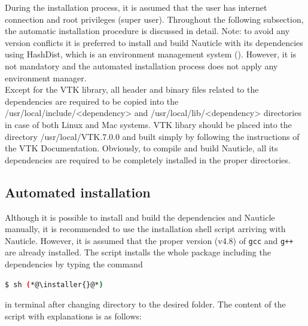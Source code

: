 \documentclass[a4paper,12pt,openany]{book}
\newcommand{\myhref}[3][nauticlegreen_dark]{\href{#2}{\color{#1}{#3}}}%
\theoremstyle{break}
\begin{document}
During the installation process, it is assumed that the user has internet connection and root privileges (super user). Throughout the following subsection, the automatic installation procedure is discussed in detail.
Note: to avoid any version conflicts it is preferred to install and build Nauticle with its dependencies using HashDist, which is an environment management system (\myhref{https://github.com/hashdist/hashdist}{https://github.com/hashdist/ hashdist}). However, it is not mandatory and the automated installation process does not apply any environment manager. \\
Except for the VTK library, all header and binary files related to the dependencies are required to be copied into the /usr/local/include/<dependency> and /usr/local/lib/<dependency> directories in case of both Linux and Mac systems. VTK libary should be placed into the directory /usr/local/VTK.7.0.0 and built simply by following the instructions of the VTK Documentation. Obviously, to compile and build Nauticle, all its dependencies are required to be completely installed in the proper directories.
\subsection{Automated installation}
Although it is possible to install and build the dependencies and Nauticle manually, it is recommended to use the installation shell script arriving with Nauticle. However, it is assumed that the proper version (v4.8) of \texttt{gcc} and \texttt{g++} are already installed. The script installs the whole package including the dependencies by typing the command
\begin{lstlisting}[language=bash]
  $ sh (*@\installer{}@*)
\end{lstlisting}
in terminal after changing directory to the desired folder. The content of the script with explanations is as follows:
\end{document}
